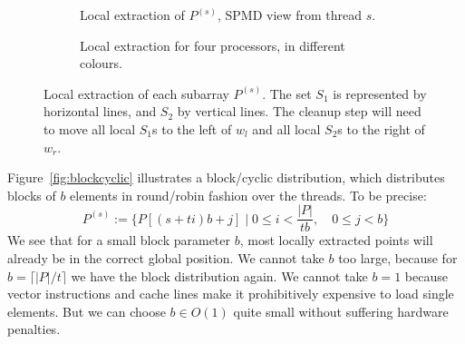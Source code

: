\documentclass[11pt,a4paper]{article}
\begin{document}
\begin{figure}[ht]
  \begin{subfigure}[b]{\linewidth}
    \caption{Local extraction of $P^{(s)}$, SPMD view from thread $s$.}%
  \end{subfigure}
  \begin{subfigure}[b]{\linewidth}
    \caption{Local extraction for four processors, in different colours.}%
  \end{subfigure}%
  \caption{Local extraction of each subarray $P^{(s)}$.
  The set $S_1$ is represented by horizontal lines, and $S_2$ by vertical lines.
  The cleanup step will need to move all local $S_1$s to the left of $w_l$ and all local $S_2$s to the right of $w_r$.}%
  \label{fig:block}%
\end{figure}

Figure~\ref{fig:blockcyclic} illustrates a block\-/cyclic distribution, which distributes blocks of $b$ elements in round\-/robin fashion over the threads.
To be precise:
\[
P^{(s)} := \{P[(s + ti)b + j] \mid 0 \leq i < \frac{|P|}{tb}, \quad 0 \leq j < b\}
\]
We see that for a small block parameter $b$, most locally extracted points will already be in the correct global position.
We cannot take $b$ too large, because for $b = \lceil |P| / t \rceil$ we have the block distribution again.
We cannot take $b = 1$ because vector instructions and cache lines make it prohibitively expensive to load single elements.
But we can choose $b \in O(1)$ quite small without suffering hardware penalties.
\end{document}
